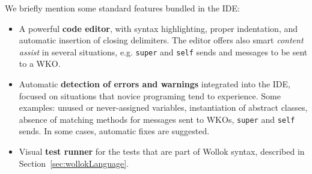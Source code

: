 \medskip
We briefly mention some standard features bundled in the IDE:
\begin{itemize}
\item 
A powerful \textbf{code editor}, with syntax highlighting, proper indentation, and automatic insertion of closing delimiters. The editor offers also smart \emph{content assist} in several situations, e.g. \texttt{super} and \texttt{self} sends and messages to be sent to a WKO.

\item
Automatic \textbf{detection of errors and warnings} integrated into the IDE, focused on situations that novice programing tend to experience. Some examples: unused or never-assigned variables, instantiation of abstract classes, absence of matching methods for messages sent to WKOs, \texttt{super} and \texttt{self} sends. In some cases, automatic fixes are suggested.

\item
Visual \textbf{test runner} for the tests that are part of Wollok syntax, described in Section~\ref{sec:wollokLanguage}.
\end{itemize}
